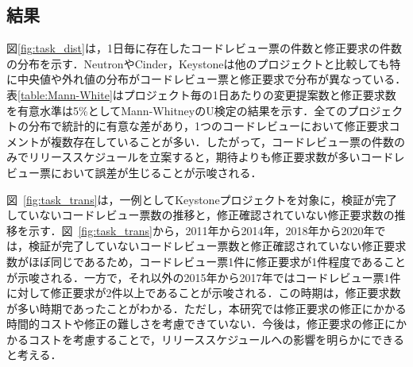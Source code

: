 \documentclass[submit,techrep,noauthor]{ipsj}
\begin{document}
\subsection{結果}
図\ref{fig:task_dist}は，1日毎に存在したコードレビュー票の件数と修正要求の件数の分布を示す．NeutronやCinder，Keystoneは他のプロジェクトと比較しても特に中央値や外れ値の分布がコードレビュー票と修正要求で分布が異なっている．表\ref{table:Mann-White}はプロジェクト毎の1日あたりの変更提案数と修正要求数を有意水準は5\%としてMann-WhitneyのU検定の結果を示す．全てのプロジェクトの分布で統計的に有意な差があり，1つのコードレビューにおいて修正要求コメントが複数存在していることが多い．したがって，コードレビュー票の件数のみでリリーススケジュールを立案すると，期待よりも修正要求数が多いコードレビュー票において誤差が生じることが示唆される．

図~\ref{fig:task_trans}は，一例としてKeystoneプロジェクトを対象に，検証が完了していないコードレビュー票数の推移と，修正確認されていない修正要求数の推移を示す．図~\ref{fig:task_trans}から，2011年から2014年，2018年から2020年では，検証が完了していないコードレビュー票数と修正確認されていない修正要求数がほぼ同じであるため，コードレビュー票1件に修正要求が1件程度であることが示唆される．一方で，それ以外の2015年から2017年ではコードレビュー票1件に対して修正要求が2件以上であることが示唆される．この時期は，修正要求数が多い時期であったことがわかる．ただし，本研究では修正要求の修正にかかる時間的コストや修正の難しさを考慮できていない．今後は，修正要求の修正にかかるコストを考慮することで，リリーススケジュールへの影響を明らかにできると考える．


\begin{table}[t]
\centering
  \caption{プロジェクト毎の1日あたりの変更提案数と修正要求数の分布}
  \label{table:Mann-White}
\end{table}
\end{document}
